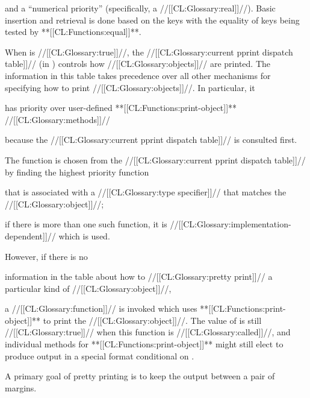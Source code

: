  and a ``numerical priority'' (specifically, a //[[CL:Glossary:real]]//).
Basic insertion and retrieval is done based on the keys with the equality
of keys being tested by **[[CL:Functions:equal]]**.

When  is //[[CL:Glossary:true]]//, 
the //[[CL:Glossary:current pprint dispatch table]]// (in )
controls how //[[CL:Glossary:objects]]// are printed.
The information in this table takes precedence over
all other mechanisms for specifying how to print //[[CL:Glossary:objects]]//.
In particular, it 

has priority over
user-defined **[[CL:Functions:print-object]]** //[[CL:Glossary:methods]]// 


because the //[[CL:Glossary:current pprint dispatch table]]// is consulted first.



The function is chosen from the //[[CL:Glossary:current pprint dispatch table]]//
by finding the highest priority function 


that is associated with a //[[CL:Glossary:type specifier]]// that matches the //[[CL:Glossary:object]]//;



if there is more than one such function, 
it is //[[CL:Glossary:implementation-dependent]]// which is used.

However, if there is no 


information in the table
about how to //[[CL:Glossary:pretty print]]// a particular kind of //[[CL:Glossary:object]]//, 


a //[[CL:Glossary:function]]// is invoked which uses **[[CL:Functions:print-object]]** to print the //[[CL:Glossary:object]]//.
The value of  is still //[[CL:Glossary:true]]// 
when this function is //[[CL:Glossary:called]]//,
and individual methods for **[[CL:Functions:print-object]]** might still elect to
produce output in a special format conditional on .


\endsubsubsection%


A primary goal of pretty printing is to keep the output between a pair of
margins. 








